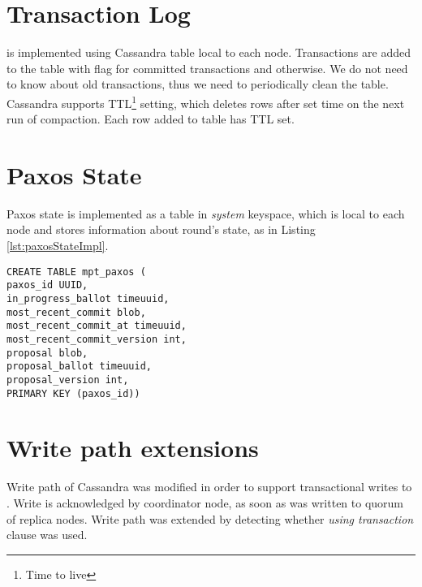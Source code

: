 


\section{Transaction Log}
\txLog is implemented using Cassandra table local to each node. 
Transactions are added to the table with flag  for committed transactions and  otherwise. We do not need to know about old transactions, thus we need to periodically clean the table. Cassandra supports TTL\footnote{Time to live} setting, which deletes rows after set time on the next run of compaction. Each row added to \txLog table has TTL set.


\section{Paxos State}
Paxos state is implemented as a table in \emph{system} keyspace, which is local to each node and stores information about \paxos round's state, as in Listing \ref{lst:paxosStateImpl}.

\begin{lstlisting}[style=outcode,label={lst:paxosStateImpl},caption={Table definition for multi partition transactions paxos state}]
CREATE TABLE mpt_paxos (
paxos_id UUID,
in_progress_ballot timeuuid,
most_recent_commit blob,
most_recent_commit_at timeuuid,
most_recent_commit_version int,
proposal blob,
proposal_ballot timeuuid,
proposal_version int,
PRIMARY KEY (paxos_id))
\end{lstlisting}



\section{Write path extensions}
Write path of Cassandra \cite{CassandraWritePath} was modified in order to support transactional writes to \txStorage.
Write is acknowledged by coordinator node, as soon as  was written to quorum of replica nodes.
Write path was extended by detecting whether \emph{using transaction} clause was used. 

